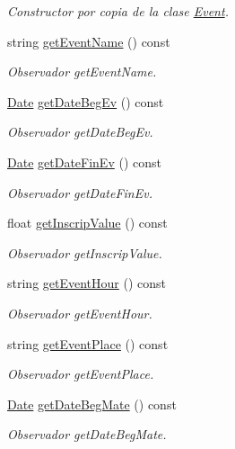 \begin{DoxyCompactItemize}
\begin{DoxyCompactList}\small\item\em Constructor por copia de la clase \hyperlink{class_event}{Event}. \end{DoxyCompactList}\item 
string \hyperlink{class_event_a039da9c8718a10118c751cfece9c0202}{get\+Event\+Name} () const 
\begin{DoxyCompactList}\small\item\em Observador get\+Event\+Name. \end{DoxyCompactList}\item 
\hyperlink{class_date}{Date} \hyperlink{class_event_a02a80e4f88bb11f0f13b2c4d77e14608}{get\+Date\+Beg\+Ev} () const 
\begin{DoxyCompactList}\small\item\em Observador get\+Date\+Beg\+Ev. \end{DoxyCompactList}\item 
\hyperlink{class_date}{Date} \hyperlink{class_event_ad08ca642b7b5fcc7884673169e60e10a}{get\+Date\+Fin\+Ev} () const 
\begin{DoxyCompactList}\small\item\em Observador get\+Date\+Fin\+Ev. \end{DoxyCompactList}\item 
float \hyperlink{class_event_a38ceadf6f0b9c60d4c4040c09123fb90}{get\+Inscrip\+Value} () const 
\begin{DoxyCompactList}\small\item\em Observador get\+Inscrip\+Value. \end{DoxyCompactList}\item 
string \hyperlink{class_event_a972bab2aa104037272cf41eddb96b8af}{get\+Event\+Hour} () const 
\begin{DoxyCompactList}\small\item\em Observador get\+Event\+Hour. \end{DoxyCompactList}\item 
string \hyperlink{class_event_aa74ed15321f27ab38bd883271433b9dd}{get\+Event\+Place} () const 
\begin{DoxyCompactList}\small\item\em Observador get\+Event\+Place. \end{DoxyCompactList}\item 
\hyperlink{class_date}{Date} \hyperlink{class_event_a0466f9ab15328e36f6d117280f570544}{get\+Date\+Beg\+Mate} () const 
\begin{DoxyCompactList}\small\item\em Observador get\+Date\+Beg\+Mate. \end{DoxyCompactList}\item 

\end{DoxyCompactItemize}
